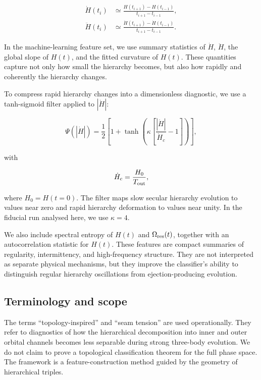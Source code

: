 \documentclass[12pt,a4paper]{article}
\newcommand{\Ores}{\Omega_{\rm res}}
\newcommand{\Tout}{T_{\rm out}}
\begin{document}
\begin{align}
    \dot H(t_i)
    &\simeq
    \frac{H(t_{i+1})-H(t_{i-1})}{t_{i+1}-t_{i-1}},
    \label{eq:Hdot}
    \\
    \ddot H(t_i)
    &\simeq
    \frac{\dot H(t_{i+1})-\dot H(t_{i-1})}{t_{i+1}-t_{i-1}}.
    \label{eq:Hddot}
\end{align}

In the machine-learning feature set, we use summary statistics of \(\dot H\), \(\ddot H\), the global slope of \(H(t)\), and the fitted curvature of \(H(t)\). These quantities capture not only how small the hierarchy becomes, but also how rapidly and coherently the hierarchy changes.

To compress rapid hierarchy changes into a dimensionless diagnostic, we use a tanh-sigmoid filter applied to \(|\dot H|\):

\begin{equation}
    \Psi(|\dot H|)
    =
    \frac{1}{2}
    \left[
    1+
    \tanh
    \left(
    \kappa
    \left[
    \frac{|\dot H|}{\dot H_c}-1
    \right]
    \right)
    \right],
    \label{eq:psi_filter}
\end{equation}

with

\begin{equation}
    \dot H_c = \frac{H_0}{\Tout},
    \label{eq:Hdotc}
\end{equation}

where \(H_0=H(t=0)\). The filter maps slow secular hierarchy evolution to values near zero and rapid hierarchy deformation to values near unity. In the fiducial run analysed here, we use \(\kappa=4\).

We also include spectral entropy of \(H(t)\) and \(\Ores(t)\), together with an autocorrelation statistic for \(H(t)\). These features are compact summaries of regularity, intermittency, and high-frequency structure. They are not interpreted as separate physical mechanisms, but they improve the classifier's ability to distinguish regular hierarchy oscillations from ejection-producing evolution.

\subsection{Terminology and scope}
\label{sec:terminology_scope}

The terms ``topology-inspired'' and ``seam tension'' are used operationally. They refer to diagnostics of how the hierarchical decomposition into inner and outer orbital channels becomes less separable during strong three-body evolution. We do not claim to prove a topological classification theorem for the full phase space. The framework is a feature-construction method guided by the geometry of hierarchical triples.
\end{document}
